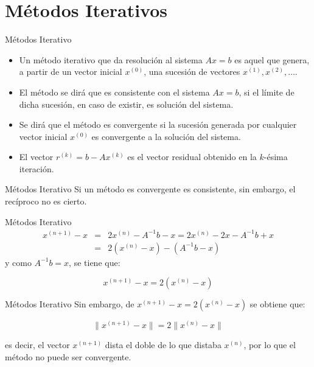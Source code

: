 \documentclass[10pt]{beamer}
\begin{document}
  \section{M\'etodos Iterativos}
  \begin{frame}{M\'etodos Iterativo}
  \begin{itemize}
  \item<1-> Un m\'etodo iterativo que da resoluci\'on al sistema $Ax = b$ es aquel que genera, a partir de un vector inicial $x^{(0)}$, una sucesi\'on de vectores $x^{(1)},x^{(2)}, \ldots$.
  \item<2-> El m\'etodo se dir\'a que es consistente con el sistema $Ax = b$, si el l\'imite de dicha sucesi\'on, en caso de existir, es
  soluci\'on del sistema.
  \item<3-> Se dir\'a que el m\'etodo es convergente si la sucesi\'on generada por cualquier vector inicial $x^{(0)}$ es convergente a la soluci\'on del sistema.
  \item<4-> El vector $r^{(k)} = b-Ax^{(k)}$ es el vector residual obtenido en la $k$-\'esima iteraci\'on.
  \end{itemize}
  \end{frame}
  \begin{frame}{M\'etodos Iterativo}
  Si un m\'etodo es convergente es consistente, sin embargo, el rec\'iproco no es cierto.
  \end{frame}
  \begin{frame}{M\'etodos Iterativo}
  \begin{eqnarray}
  x^{(n+1)}-x & = & 2x^{(n)}-A^{-1}b-x = 2x^{(n)}-2x-A^{-1}b+x \nonumber\\
  & = & 2(x^{(n)}-x)-(A^{-1}b-x)\nonumber
  \end{eqnarray}
  y como $A^{-1}b = x$, se tiene que:
  \begin{block}{}
  $$
  x^{(n+1)}-x = 2(x^{(n)}-x)
  $$
  \end{block}
  \end{frame}
  \begin{frame}{M\'etodos Iterativo}
  Sin embargo, de $x^{(n+1)} - x = 2(x^{(n)} - x)$ se obtiene que:
  \begin{block}{}
  $$
  \|x^{(n+1)}-x\| = 2\|x^{(n)}-x\|
  $$
  \end{block}
  es decir, el vector $x^{(n+1)}$ dista el doble de lo que distaba $x^{(n)}$, por lo que el m\'etodo no puede ser convergente.
  \end{frame}  
\end{document}

